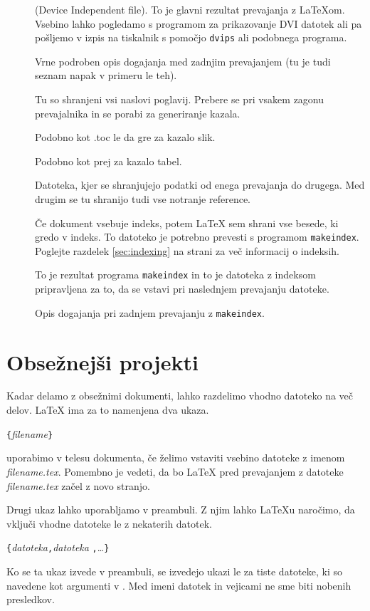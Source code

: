 \begin{description}
\item[] (Device Independent file). To je glavni rezultat prevajanja z \LaTeX{}om.
  Vsebino lahko pogledamo s programom za prikazovanje DVI datotek ali pa pošljemo v izpis
  na tiskalnik s pomočjo \texttt{dvips} ali podobnega programa.
\item[] Vrne podroben opis dogajanja med zadnjim prevajanjem (tu je tudi seznam napak v primeru le teh).
\item[] Tu so shranjeni vsi naslovi poglavij. Prebere se pri vsakem zagonu prevajalnika in se porabi
  za generiranje kazala.
\item[] Podobno kot .toc le da gre za kazalo slik.
\item[] Podobno kot prej za kazalo tabel.
\item[] Datoteka, kjer se shranjujejo podatki od enega prevajanja do drugega. Med drugim se 
 tu shranijo tudi vse notranje reference.
\item[] Če dokument vsebuje indeks, potem \LaTeX{} sem shrani vse besede, ki gredo v indeks. 
  To datoteko je potrebno prevesti s programom \texttt{makeindex}. Poglejte razdelek \ref{sec:indexing} na strani 
  \pageref{sec:indexing} za več informacij o indeksih.
\item[] To je rezultat programa \texttt{makeindex} in to je datoteka z indeksom pripravljena 
  za to, da se vstavi pri naslednjem prevajanju datoteke.
  \item[] Opis dogajanja pri zadnjem prevajanju z \texttt{makeindex}.
\end{description}

\section{Obsežnejši projekti}
Kadar delamo z obsežnimi dokumenti, lahko razdelimo vhodno datoteko na več delov. 
\LaTeX{} ima za to namenjena dva ukaza.

\begin{lscommand}
\verb|{|\emph{filename}\verb|}|
\end{lscommand}
\noindent uporabimo v telesu dokumenta, če želimo vstaviti vsebino datoteke 
z imenom \emph{filename.tex}. Pomembno je vedeti, da bo  \LaTeX{}
pred prevajanjem z datoteke \emph{filename.tex} začel z novo stranjo.

Drugi ukaz lahko uporabljamo v preambuli. Z njim lahko 
\LaTeX{}u naročimo, da vključi vhodne datoteke le z nekaterih  \verb|| datotek.
\begin{lscommand}
\verb|{|\emph{datoteka}\verb|,|\emph{datoteka}%
\verb|,|\ldots\verb|}|
\end{lscommand}
Ko se ta ukaz izvede v preambuli, se izvedejo ukazi  le za tiste datoteke, ki so navedene 
kot argumenti v . Med imeni datotek in vejicami ne sme biti nobenih presledkov.

